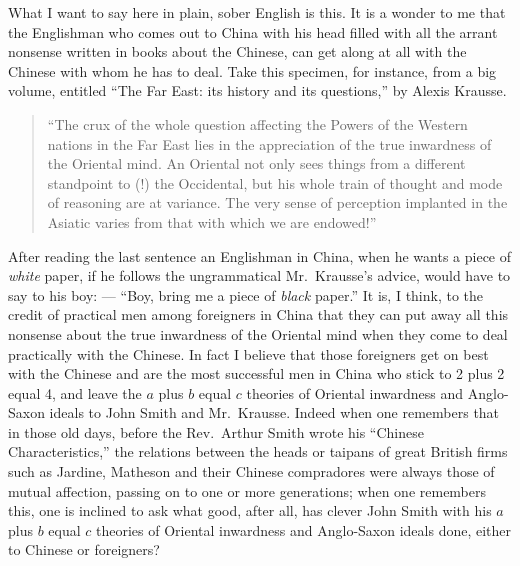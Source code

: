 What I want to say here in plain, sober English is this.
It is a wonder to me that the Englishman who comes out to China with his head filled with all the arrant nonsense written in books about the Chinese, can get along at all with the Chinese with whom he has to deal.
Take this specimen, for instance, from a big volume, entitled ``The Far East: its history and its questions,'' by Alexis Krausse. 
\begin{quote} \footnotesize
``The crux of the whole question affecting the Powers of the Western nations in the Far East lies in the appreciation of the true inwardness of the Oriental mind.
An Oriental not only sees things from a different standpoint to (!) the Occidental, but his whole train of thought and mode of reasoning are at variance.
The very sense of perception implanted in the Asiatic varies from that with which we are endowed!''
\end{quote}

After reading the last sentence an Englishman in China, when he wants a piece of \emph{white} paper, if he follows the ungrammatical Mr.~Krausse's advice, would have to say to his boy: --- ``Boy, bring me a piece of \emph{black} paper.''
It is, I think, to the credit of practical men among foreigners in China that they can put away all this nonsense about the true inwardness of the Oriental mind when they come to deal practically with the Chinese.
In fact I believe that those foreigners get on best with the Chinese and are the most successful men in China who stick to 2 plus 2 equal 4, and leave the $a$ plus $b$ equal $c$ theories of Oriental inwardness and Anglo-Saxon ideals to John Smith and Mr.~Krausse.
Indeed when one remembers that in those old days, before the Rev.~Arthur Smith wrote his ``Chinese Characteristics,'' the relations between the heads or taipans  of great British firms such as Jardine, Matheson and their Chinese compradores  were always those of mutual affection, passing on to one or more generations;
when one remembers this, one is inclined to ask what good, after all, has clever John Smith with his $a$ plus $b$ equal $c$ theories of Oriental inwardness and Anglo-Saxon ideals done, either to Chinese or foreigners?

